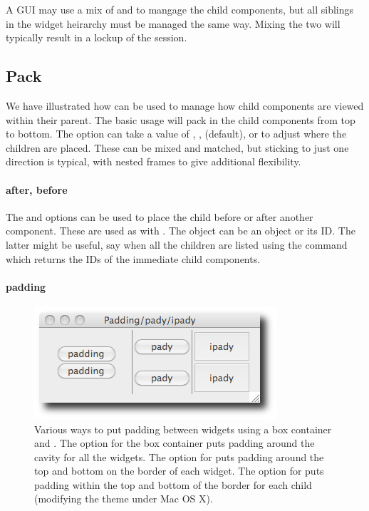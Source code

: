 A GUI may use a mix of  and  to mangage the child components,
but all siblings in the widget heirarchy must be managed the same
way. Mixing the two will typically result in a lockup of the \R\/
session.


\subsection{Pack}
\label{sec:tcltk:pack}


We have illustrated how  can be used to manage how
child components are viewed within their parent. The basic usage
 will pack in the child components from top to
bottom. The  option can take a value of
, ,  (default), or 
to adjust where the children are placed. These can be mixed and
matched, but sticking to just one direction is typical, with nested
frames to give additional flexibility.

\paragraph{after, before}
The  and  options can be
used to place the child before or after another component. These are
used as with . The object
 can be an \R\/ object or its ID. The latter might be
useful, say when all the children are listed using the command
 which returns the IDs of the
immediate child components.

\paragraph{padding}

\begin{figure}
  \centering
  \includegraphics[width=.6\textwidth]{fig-tcltk-padding-pady-ipady}
 \caption{Various ways to put padding between widgets using a box container and . The  option for the box container puts padding around the cavity for all the widgets. The  option for  puts padding around the top and bottom on the border of each widget. The  option for  puts padding within the top and bottom of the border for each child (modifying the theme under Mac OS X).}
  \label{fig:fig-pack-example}
\end{figure}


